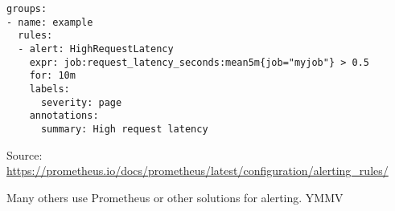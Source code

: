\documentclass[Screen16to9,17pt]{foils}
\begin{document}


\begin{verbatim}
groups:
- name: example
  rules:
  - alert: HighRequestLatency
    expr: job:request_latency_seconds:mean5m{job="myjob"} > 0.5
    for: 10m
    labels:
      severity: page
    annotations:
      summary: High request latency
\end{verbatim}
Source: \url{https://prometheus.io/docs/prometheus/latest/configuration/alerting_rules/}

\begin{list2}
\item Many others use Prometheus or other solutions for alerting. YMMV
\end{list2}




\slidenext{}
\end{document}
